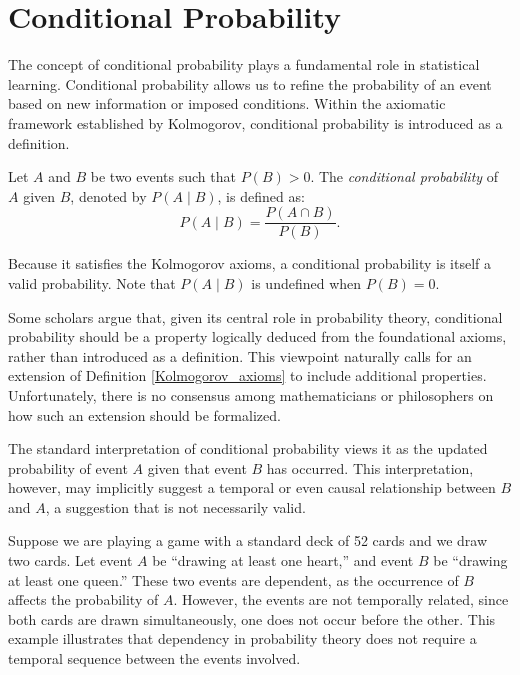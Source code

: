 %
%

\section{Conditional Probability}
\label{sec:probability_conditional}

The concept of conditional probability plays a fundamental role in statistical learning. Conditional probability allows us to refine the probability of an event based on new information or imposed conditions. Within the axiomatic framework established by Kolmogorov, conditional probability is introduced as a definition.

\begin{definition}
Let $A$ and $B$ be two events such that $P(B) > 0$. The \emph{conditional probability} of $A$ given $B$, denoted by $P(A \mid B)$, is defined as:
\[
P(A \mid B) = \frac{P(A \cap B)}{P(B)}.
\]
\end{definition}

Because it satisfies the Kolmogorov axioms, a conditional probability is itself a valid probability. Note that $P(A \mid B)$ is undefined when $P(B) = 0$.

Some scholars argue that, given its central role in probability theory, conditional probability should be a property logically deduced from the foundational axioms, rather than introduced as a definition. This viewpoint naturally calls for an extension of Definition \ref{Kolmogorov_axioms} to include additional properties. Unfortunately, there is no consensus among mathematicians or philosophers on how such an extension should be formalized.

The standard interpretation of conditional probability views it as the updated probability of event $A$ given that event $B$ has occurred. This interpretation, however, may implicitly suggest a temporal or even causal relationship between $B$ and $A$, a suggestion that is not necessarily valid.

\begin{example}
\label{ex:concurrent_events}
Suppose we are playing a game with a standard deck of 52 cards and we draw two cards. Let event $A$ be “drawing at least one heart,” and event $B$ be “drawing at least one queen.” These two events are dependent, as the occurrence of $B$ affects the probability of $A$. However, the events are not temporally related, since both cards are drawn simultaneously, one does not occur before the other. This example illustrates that dependency in probability theory does not require a temporal sequence between the events involved.
\end{example}

